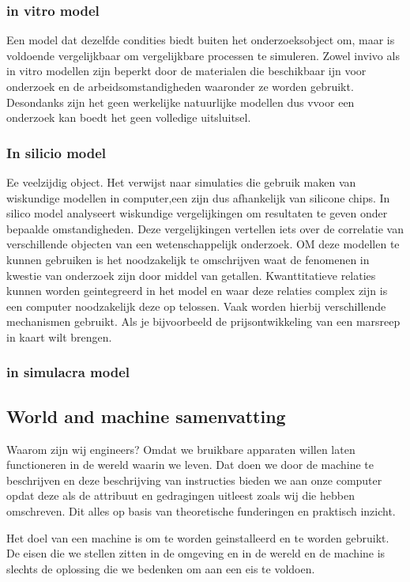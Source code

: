 \subsubsection{in vitro model}
Een model dat dezelfde condities biedt  buiten het onderzoeksobject om, maar is voldoende vergelijkbaar om vergelijkbare processen te simuleren.
Zowel invivo als in vitro modellen zijn beperkt door de materialen die beschikbaar ijn voor onderzoek en de arbeidsomstandigheden waaronder ze worden gebruikt. Desondanks zijn het geen werkelijke natuurlijke modellen dus vvoor een onderzoek kan boedt het geen volledige uitsluitsel.
\subsubsection{In silicio model}
Ee veelzijdig object. Het verwijst naar simulaties die gebruik maken van wiskundige modellen in computer,een zijn dus afhankelijk van silicone chips. In silico model analyseert  wiskundige vergelijkingen om resultaten te geven onder bepaalde omstandigheden. Deze vergelijkingen vertellen iets over de correlatie van verschillende objecten van een wetenschappelijk onderzoek. OM deze modellen te kunnen gebruiken is het noodzakelijk te omschrijven waat de fenomenen in kwestie van onderzoek zijn door middel van getallen. Kwanttitatieve relaties kunnen worden geintegreerd in het model en waar deze relaties complex zijn is een computer noodzakelijk deze op telossen. Vaak worden hierbij verschillende mechanismen gebruikt. Als je bijvoorbeeld de prijsontwikkeling van een marsreep in kaart wilt brengen.
\subsubsection{in simulacra model}

\subsection{World and machine samenvatting}
Waarom zijn wij engineers? Omdat we bruikbare apparaten willen laten functioneren in de wereld waarin we leven. Dat doen we door de machine te beschrijven en deze beschrijving van instructies bieden we aan onze computer opdat deze als de attribuut en gedragingen uitleest zoals wij die hebben omschreven. Dit alles op basis van theoretische funderingen en praktisch inzicht. 

Het doel van een machine is om te worden geinstalleerd en te worden gebruikt. De eisen die we stellen zitten in de omgeving en in de wereld en de machine is slechts de oplossing die we bedenken om aan een eis te voldoen. 

